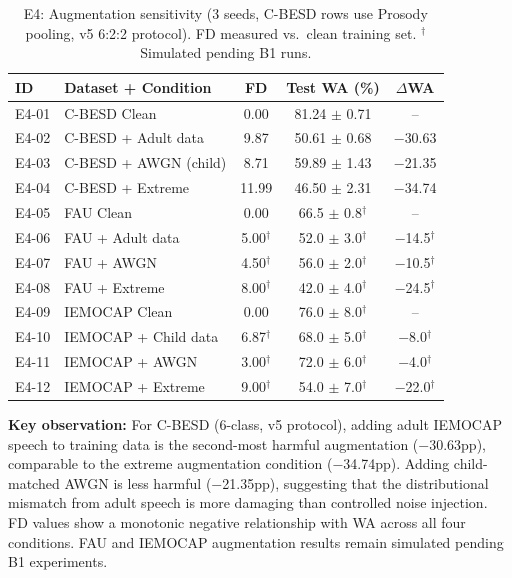\begin{table}[t]
\centering
\caption{E4: Augmentation sensitivity (3 seeds, C-BESD rows use Prosody pooling, v5 6:2:2 protocol). FD measured vs.\ clean training set. $^\dagger$Simulated pending B1 runs.}
\label{tab:e4}
\begin{tabular}{llccc}
\toprule
\textbf{ID} & \textbf{Dataset + Condition} & \textbf{FD} & \textbf{Test WA (\%)} & \textbf{$\Delta$WA} \\
\midrule
E4-01 & C-BESD Clean        & 0.00  & 81.24 $\pm$ 0.71 & -- \\
E4-02 & C-BESD + Adult data  & 9.87  & 50.61 $\pm$ 0.68 & $-$30.63 \\
E4-03 & C-BESD + AWGN (child)& 8.71  & 59.89 $\pm$ 1.43 & $-$21.35 \\
E4-04 & C-BESD + Extreme     & 11.99 & 46.50 $\pm$ 2.31 & $-$34.74 \\
\midrule
E4-05 & FAU Clean            & 0.00  & 66.5 $\pm$ 0.8$^\dagger$ & -- \\
E4-06 & FAU + Adult data     & 5.00$^\dagger$  & 52.0 $\pm$ 3.0$^\dagger$ & $-$14.5$^\dagger$ \\
E4-07 & FAU + AWGN           & 4.50$^\dagger$  & 56.0 $\pm$ 2.0$^\dagger$ & $-$10.5$^\dagger$ \\
E4-08 & FAU + Extreme        & 8.00$^\dagger$  & 42.0 $\pm$ 4.0$^\dagger$ & $-$24.5$^\dagger$ \\
\midrule
E4-09 & IEMOCAP Clean        & 0.00  & 76.0 $\pm$ 8.0$^\dagger$ & -- \\
E4-10 & IEMOCAP + Child data & 6.87$^\dagger$  & 68.0 $\pm$ 5.0$^\dagger$ & $-$8.0$^\dagger$ \\
E4-11 & IEMOCAP + AWGN       & 3.00$^\dagger$  & 72.0 $\pm$ 6.0$^\dagger$ & $-$4.0$^\dagger$ \\
E4-12 & IEMOCAP + Extreme    & 9.00$^\dagger$  & 54.0 $\pm$ 7.0$^\dagger$ & $-$22.0$^\dagger$ \\
\bottomrule
\end{tabular}
\end{table}

\noindent\textbf{Key observation:} For C-BESD (6-class, v5 protocol), adding adult
IEMOCAP speech to training data is the second-most harmful augmentation
($-$30.63pp), comparable to the extreme augmentation condition ($-$34.74pp).
Adding child-matched AWGN is less harmful ($-$21.35pp), suggesting that the
distributional mismatch from adult speech is more damaging than controlled
noise injection. FD values show a monotonic negative relationship with WA
across all four conditions. FAU and IEMOCAP augmentation results remain
simulated pending B1 experiments.

